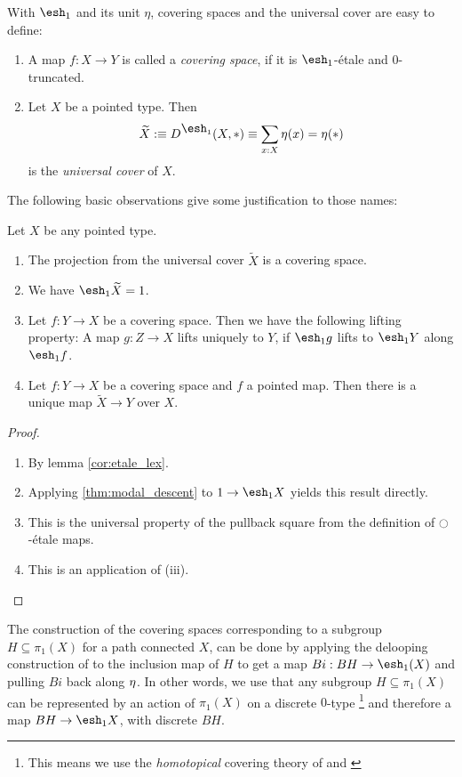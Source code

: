 \documentclass[9pt,twosided]{amsart}
\newcommand{\shape}{\ensuremath{\mathord{\raisebox{0.5pt}{\text{\rm\esh}}}}}
\begin{document}
With $\shape_1$ and its unit $\eta$, covering spaces and the universal cover are easy to define:
\begin{defn}
  \begin{enumerate}
  \item A map $f:X\to Y$ is called a \emph{covering space}, if it is $\shape_1$-étale and $0$-truncated.
  \item Let $X$ be a pointed type. Then
    \[ \widetilde{X}:\equiv D^{\shape_1}(X,\ast)\equiv\sum_{x:X}\modalunit(x)=\modalunit(\ast) \]
    is the \emph{universal cover} of $X$.
  \end{enumerate}

\end{defn}
The following basic observations give some justification to those names:
\begin{rmk}
  Let $X$ be any pointed type.
  \begin{enumerate}
  \item The projection from the universal cover $\widetilde{X}$ is a covering space.
  \item We have $\shape_1 \widetilde{X} = 1$.
  \item Let $f:Y\to X$ be a covering space. Then we have the following lifting property:
    A map $g:Z\to X$ lifts uniquely to $Y$, if $\shape_1 g$ lifts to $\shape_1 Y$ along $\shape_1 f$.
  \item Let $f:Y\to X$ be a covering space and $f$ a pointed map. Then there is a unique map $\widetilde{X}\to Y$ over $X$.
  \end{enumerate}
\end{rmk}
\begin{proof}
  \begin{enumerate}
  \item By lemma \ref{cor:etale_lex}. 
  \item Applying \ref{thm:modal_descent} to $1\to \shape_1 X$ yields this result directly.
  \item This is the universal property of the pullback square from the definition of ${\ocircle}$-étale maps.
  \item This is an application of (iii).
  \end{enumerate}
\end{proof}

The construction of the covering spaces corresponding to a subgroup $H\subseteq \pi_1(X)$ for a path connected $X$,
can be done by applying the delooping construction of \cite{LicataFinster} to the inclusion map of $H$ to get a map $Bi:BH\to\shape_1(X)$ and pulling $Bi$ back along ${\eta_{}}$. In other words, we use that any subgroup $H\subseteq\pi_1(X)$ can be represented by an action of $\pi_1(X)$ on a discrete $0$-type
\footnote{This means we use the \emph{homotopical} covering theory of \cite[Section 3.1]{favonia-thesis} 
and \cite[Section 7.1]{ulrik-egbert-floris-groups}}
and therefore a map $BH\to \shape_1X$, with discrete $BH$.
\end{document}
